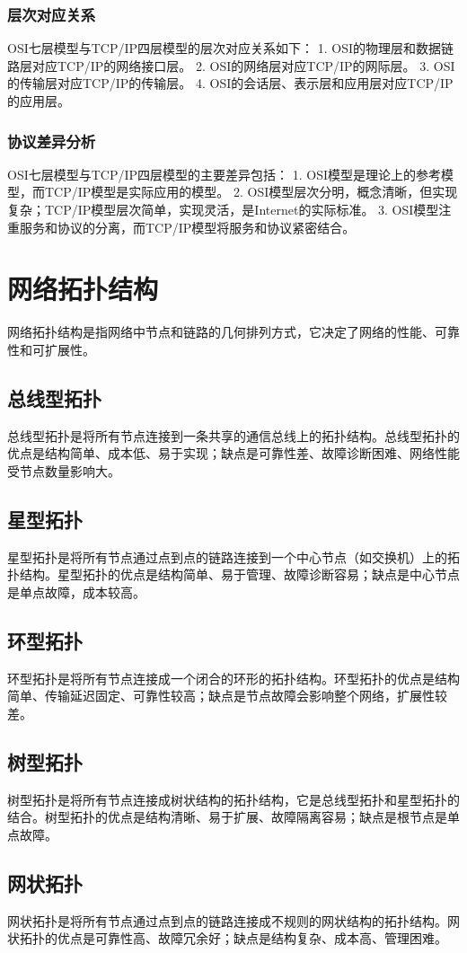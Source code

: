 \documentclass{book}
\begin{document}
\subsubsection{层次对应关系}
OSI七层模型与TCP/IP四层模型的层次对应关系如下：
1. OSI的物理层和数据链路层对应TCP/IP的网络接口层。
2. OSI的网络层对应TCP/IP的网际层。
3. OSI的传输层对应TCP/IP的传输层。
4. OSI的会话层、表示层和应用层对应TCP/IP的应用层。
\subsubsection{协议差异分析}
OSI七层模型与TCP/IP四层模型的主要差异包括：
1. OSI模型是理论上的参考模型，而TCP/IP模型是实际应用的模型。
2. OSI模型层次分明，概念清晰，但实现复杂；TCP/IP模型层次简单，实现灵活，是Internet的实际标准。
3. OSI模型注重服务和协议的分离，而TCP/IP模型将服务和协议紧密结合。
\section{网络拓扑结构}
网络拓扑结构是指网络中节点和链路的几何排列方式，它决定了网络的性能、可靠性和可扩展性。
\subsection{总线型拓扑}
总线型拓扑是将所有节点连接到一条共享的通信总线上的拓扑结构。总线型拓扑的优点是结构简单、成本低、易于实现；缺点是可靠性差、故障诊断困难、网络性能受节点数量影响大。
\subsection{星型拓扑}
星型拓扑是将所有节点通过点到点的链路连接到一个中心节点（如交换机）上的拓扑结构。星型拓扑的优点是结构简单、易于管理、故障诊断容易；缺点是中心节点是单点故障，成本较高。
\subsection{环型拓扑}
环型拓扑是将所有节点连接成一个闭合的环形的拓扑结构。环型拓扑的优点是结构简单、传输延迟固定、可靠性较高；缺点是节点故障会影响整个网络，扩展性较差。
\subsection{树型拓扑}
树型拓扑是将所有节点连接成树状结构的拓扑结构，它是总线型拓扑和星型拓扑的结合。树型拓扑的优点是结构清晰、易于扩展、故障隔离容易；缺点是根节点是单点故障。
\subsection{网状拓扑}
网状拓扑是将所有节点通过点到点的链路连接成不规则的网状结构的拓扑结构。网状拓扑的优点是可靠性高、故障冗余好；缺点是结构复杂、成本高、管理困难。
\end{document}

